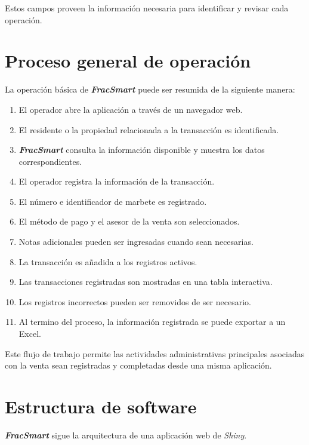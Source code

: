 \documentclass{article}
\begin{document}
\quad\quad Estos campos proveen la información necesaria para identificar y revisar cada operación.


\newpage
\section{Proceso general de operación}
\quad\quad La operación básica de \textbf{\textit{FracSmart}} puede ser resumida de la siguiente manera:

\begin{enumerate}
    \item El operador abre la aplicación a través de un navegador web.
    \item El residente o la propiedad relacionada a la transacción es identificada.
    \item \textbf{\textit{FracSmart}} consulta la información disponible y muestra los datos correspondientes.
    \item El operador registra la información de la transacción.
    \item El número e identificador de marbete es registrado.
    \item El método de pago y el asesor de la venta son seleccionados.
    \item Notas adicionales pueden ser ingresadas cuando sean necesarias.
    \item La transacción es añadida a los registros activos.
    \item Las transacciones registradas son mostradas en una tabla interactiva.
    \item Los registros incorrectos pueden ser removidos de ser necesario.
    \item Al termino del proceso, la información registrada se puede exportar a un Excel.
\end{enumerate}

\quad\quad Este flujo de trabajo permite las actividades administrativas principales asociadas con la venta sean registradas y completadas desde una misma aplicación.


\newpage
\section{Estructura de software}
\quad\quad \textbf{\textit{FracSmart}} sigue la arquitectura de una aplicación web de \textit{Shiny}. \\
\end{document}
